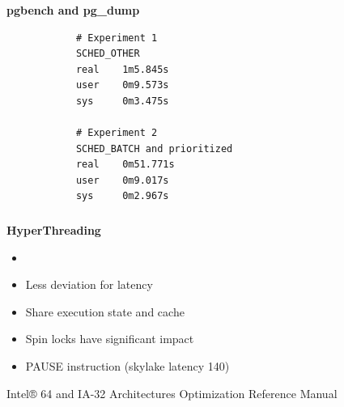 \documentclass[usenames,dvipsnames, 18pt, compress, aspectratio=169]{beamer}
\begin{document}
\begin{frame}[fragile]{}
    \frametitle{}
    \begin{center}
    \textbf{pgbench and pg\_dump}

        \begin{verbatim}
            # Experiment 1
            SCHED_OTHER
            real    1m5.845s
            user    0m9.573s
            sys     0m3.475s

            # Experiment 2
            SCHED_BATCH and prioritized
            real    0m51.771s
            user    0m9.017s
            sys     0m2.967s
        \end{verbatim}

    \end{center}
\end{frame}

\begin{frame}
    \frametitle{}
    \begin{center}
    \textbf{HyperThreading}

        \begin{itemize}
            \item <+->
        \end{itemize}

        \begin{itemize}[label={\MVRightarrow}]
            \item <+-> Less deviation for latency
            \item <+-> Share execution state and cache
            \item <+-> Spin locks have significant impact
            \item <+-> PAUSE instruction (skylake latency 140)
        \end{itemize}

        \normalsize{Intel® 64 and IA-32 Architectures Optimization Reference Manual}
    \end{center}
\end{frame}
\end{document}
